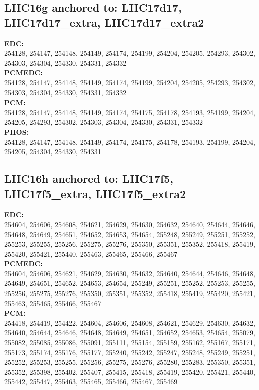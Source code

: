  \subsection{LHC16g anchored to: LHC17d17, LHC17d17\_extra, LHC17d17\_extra2}

 \textbf{EDC:}\\
254128, 254147, 254148, 254149, 254174, 254199, 254204, 254205, 254293, 254302, 254303, 254304, 254330, 254331, 254332\\

 \textbf{PCMEDC:}\\
254128, 254147, 254148, 254149, 254174, 254199, 254204, 254205, 254293, 254302, 254303, 254304, 254330, 254331, 254332\\

 \textbf{PCM:}\\
254128, 254147, 254148, 254149, 254174, 254175, 254178, 254193, 254199, 254204, 254205, 254293, 254302, 254303, 254304, 254330, 254331, 254332\\

 \textbf{PHOS:}\\
254128, 254147, 254148, 254149, 254174, 254175, 254178, 254193, 254199, 254204, 254205, 254304, 254330, 254331\\

 \subsection{LHC16h anchored to: LHC17f5, LHC17f5\_extra, LHC17f5\_extra2}

 \textbf{EDC:}\\
254604, 254606, 254608, 254621, 254629, 254630, 254632, 254640, 254644, 254646, 254648, 254649, 254651, 254652, 254653, 254654, 255248, 255249, 255251, 255252, 255253, 255255, 255256, 255275, 255276, 255350, 255351, 255352, 255418, 255419, 255420, 255421, 255440, 255463, 255465, 255466, 255467\\

 \textbf{PCMEDC:}\\
254604, 254606, 254621, 254629, 254630, 254632, 254640, 254644, 254646, 254648, 254649, 254651, 254652, 254653, 254654, 255249, 255251, 255252, 255253, 255255, 255256, 255275, 255276, 255350, 255351, 255352, 255418, 255419, 255420, 255421, 255463, 255465, 255466, 255467\\

 \textbf{PCM:}\\
254418, 254419, 254422, 254604, 254606, 254608, 254621, 254629, 254630, 254632, 254640, 254644, 254646, 254648, 254649, 254651, 254652, 254653, 254654, 255079, 255082, 255085, 255086, 255091, 255111, 255154, 255159, 255162, 255167, 255171, 255173, 255174, 255176, 255177, 255240, 255242, 255247, 255248, 255249, 255251, 255252, 255253, 255255, 255256, 255275, 255276, 255280, 255283, 255350, 255351, 255352, 255398, 255402, 255407, 255415, 255418, 255419, 255420, 255421, 255440, 255442, 255447, 255463, 255465, 255466, 255467, 255469\\

